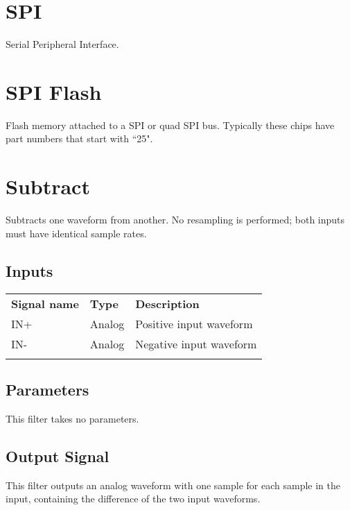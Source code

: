 \section{SPI}

Serial Peripheral Interface.

\pagebreak
\section{SPI Flash}

Flash memory attached to a SPI or quad SPI bus. Typically these chips have part numbers that start with ``25".

\pagebreak
\section{Subtract}

Subtracts one waveform from another. No resampling is performed; both inputs must have identical sample rates.

\subsection{Inputs}

\begin{tabularx}{16cm}{llX}
\thickhline
\textbf{Signal name} & \textbf{Type} & \textbf{Description} \\
\thickhline
IN+ & Analog & Positive input waveform \\
\thickhline
IN- & Analog & Negative input waveform \\
\thickhline
\end{tabularx}

\subsection{Parameters}

This filter takes no parameters.

\subsection{Output Signal}

This filter outputs an analog waveform with one sample for each sample in the input, containing the difference of the
two input waveforms.

